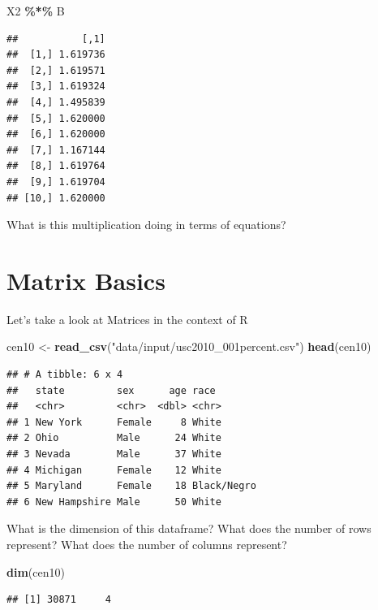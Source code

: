 \documentclass[
]{book}
\newenvironment{Shaded}{\begin{snugshade}}{\end{snugshade}}
\newcommand{\KeywordTok}[1]{\textcolor[rgb]{0.13,0.29,0.53}{\textbf{#1}}}
\newcommand{\NormalTok}[1]{#1}
\newcommand{\OperatorTok}[1]{\textcolor[rgb]{0.81,0.36,0.00}{\textbf{#1}}}
\newcommand{\StringTok}[1]{\textcolor[rgb]{0.31,0.60,0.02}{#1}}
\theoremstyle{definition}
\theoremstyle{definition}
\theoremstyle{definition}
\theoremstyle{remark}
\begin{document}
\begin{Shaded}
\begin{Highlighting}[]
\NormalTok{X2 }\OperatorTok{\%*\%}\StringTok{ }\NormalTok{B}
\end{Highlighting}
\end{Shaded}

\begin{verbatim}
##           [,1]
##  [1,] 1.619736
##  [2,] 1.619571
##  [3,] 1.619324
##  [4,] 1.495839
##  [5,] 1.620000
##  [6,] 1.620000
##  [7,] 1.167144
##  [8,] 1.619764
##  [9,] 1.619704
## [10,] 1.620000
\end{verbatim}

What is this multiplication doing in terms of equations?

\hypertarget{matrix-basics}{%
\section{Matrix Basics}\label{matrix-basics}}

Let's take a look at Matrices in the context of R

\begin{Shaded}
\begin{Highlighting}[]
\NormalTok{cen10 <{-}}\StringTok{ }\KeywordTok{read\_csv}\NormalTok{(}\StringTok{"data/input/usc2010\_001percent.csv"}\NormalTok{)}
\KeywordTok{head}\NormalTok{(cen10)}
\end{Highlighting}
\end{Shaded}

\begin{verbatim}
## # A tibble: 6 x 4
##   state         sex      age race       
##   <chr>         <chr>  <dbl> <chr>      
## 1 New York      Female     8 White      
## 2 Ohio          Male      24 White      
## 3 Nevada        Male      37 White      
## 4 Michigan      Female    12 White      
## 5 Maryland      Female    18 Black/Negro
## 6 New Hampshire Male      50 White
\end{verbatim}

What is the dimension of this dataframe? What does the number of rows represent? What does the number of columns represent?

\begin{Shaded}
\begin{Highlighting}[]
\KeywordTok{dim}\NormalTok{(cen10)}
\end{Highlighting}
\end{Shaded}

\begin{verbatim}
## [1] 30871     4
\end{verbatim}
\end{document}
